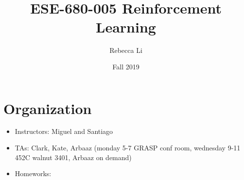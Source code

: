 \documentclass{article}
\title{ESE-680-005 Reinforcement Learning}
\author{Rebecca Li}
\date{Fall 2019}
\begin{document}
	\maketitle

\section{Organization}
\begin{itemize}
	\item Instructors: Miguel and Santiago 
	\item TAs: Clark, Kate, Arbaaz (monday 5-7 GRASP conf room, wednesday 9-11 452C walnut 3401, Arbaaz on demand)
	\item Homeworks:
\end{itemize}
\end{document}
